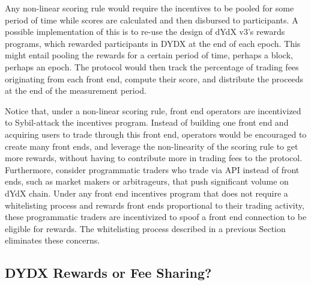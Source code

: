         Any non-linear scoring rule would require the incentives to be pooled for some period of time while scores are calculated and then disbursed to participants. A possible implementation of this is to re-use the design of dYdX v3's rewards programs, which rewarded participants in DYDX at the end of each epoch. This might entail pooling the rewards for a certain period of time, perhaps a block, perhaps an epoch. The protocol would then track the percentage of trading fees originating from each front end, compute their score, and distribute the proceeds at the end of the measurement period.

        Notice that, under a non-linear scoring rule, front end operators are incentivized to Sybil-attack the incentives program. Instead of building one front end and acquiring users to trade through this front end, operators would be encouraged to create many front ends, and leverage the non-linearity of the scoring rule to get more rewards, without having to contribute more in trading fees to the protocol.
        Furthermore, consider programmatic traders who trade via API instead of front ends, such as market makers or arbitrageurs, that push significant volume on dYdX chain. Under any front end incentives program that does not require a whitelisting process and rewards front ends proportional to their trading activity, these programmatic traders are incentivized to spoof a front end connection to be eligible for rewards. The whitelisting process described in a previous Section eliminates these concerns.
        
    \subsection{DYDX Rewards or Fee Sharing?}

